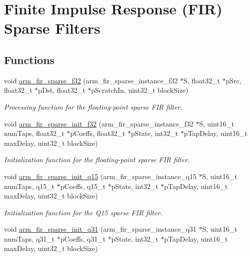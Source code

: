 \hypertarget{group__FIR__Sparse}{}\section{Finite Impulse Response (F\+IR) Sparse Filters}
\label{group__FIR__Sparse}
\subsection*{Functions}
\begin{DoxyCompactItemize}
\item 
void \hyperlink{group__FIR__Sparse_ga23a9284de5ee39406713b91d18ac8838}{arm\+\_\+fir\+\_\+sparse\+\_\+f32} (arm\+\_\+fir\+\_\+sparse\+\_\+instance\+\_\+f32 $\ast$S, float32\+\_\+t $\ast$p\+Src, float32\+\_\+t $\ast$p\+Dst, float32\+\_\+t $\ast$p\+Scratch\+In, uint32\+\_\+t block\+Size)
\begin{DoxyCompactList}\small\item\em Processing function for the floating-\/point sparse F\+IR filter. \end{DoxyCompactList}\item 
void \hyperlink{group__FIR__Sparse_ga86378a08a9d9e1e0e5de77843b34d396}{arm\+\_\+fir\+\_\+sparse\+\_\+init\+\_\+f32} (arm\+\_\+fir\+\_\+sparse\+\_\+instance\+\_\+f32 $\ast$S, uint16\+\_\+t num\+Taps, float32\+\_\+t $\ast$p\+Coeffs, float32\+\_\+t $\ast$p\+State, int32\+\_\+t $\ast$p\+Tap\+Delay, uint16\+\_\+t max\+Delay, uint32\+\_\+t block\+Size)
\begin{DoxyCompactList}\small\item\em Initialization function for the floating-\/point sparse F\+IR filter. \end{DoxyCompactList}\item 
void \hyperlink{group__FIR__Sparse_ga5eaa80bf72bcccef5a2c5fc6648d1baa}{arm\+\_\+fir\+\_\+sparse\+\_\+init\+\_\+q15} (arm\+\_\+fir\+\_\+sparse\+\_\+instance\+\_\+q15 $\ast$S, uint16\+\_\+t num\+Taps, q15\+\_\+t $\ast$p\+Coeffs, q15\+\_\+t $\ast$p\+State, int32\+\_\+t $\ast$p\+Tap\+Delay, uint16\+\_\+t max\+Delay, uint32\+\_\+t block\+Size)
\begin{DoxyCompactList}\small\item\em Initialization function for the Q15 sparse F\+IR filter. \end{DoxyCompactList}\item 
void \hyperlink{group__FIR__Sparse_ga9a0bb2134bc85d3e55c6be6d946ee634}{arm\+\_\+fir\+\_\+sparse\+\_\+init\+\_\+q31} (arm\+\_\+fir\+\_\+sparse\+\_\+instance\+\_\+q31 $\ast$S, uint16\+\_\+t num\+Taps, q31\+\_\+t $\ast$p\+Coeffs, q31\+\_\+t $\ast$p\+State, int32\+\_\+t $\ast$p\+Tap\+Delay, uint16\+\_\+t max\+Delay, uint32\+\_\+t block\+Size)

\end{DoxyCompactItemize}
